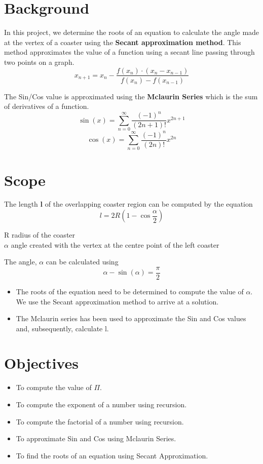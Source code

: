 \documentclass{report}
\begin{document}
\section{Background}
  In this project, we determine the roots of an equation to calculate the angle made at the vertex of a coaster using the \textbf{Secant approximation method}. This method approximates the value of a function using a secant line passing through two points on a graph.
  $$ x_{n+1} = x_n - \frac{f(x_n) \cdot (x_n - x_{n-1})}{f(x_n) - f(x_{n-1})} $$

  \vspace*{20pt}
  \noindent The Sin/Cos value is approximated using the \textbf{Mclaurin Series} which is the sum of derivatives of a function.
  $$\sin(x) = \sum_{n=0}^{\infty} \frac{(-1)^n}{(2n+1)!}x^{2n+1}$$
  $$\cos(x) = \sum_{n=0}^{\infty} \frac{(-1)^n}{(2n)!}x^{2n}$$ 

\section{Scope}
  The length \textbf{l} of the overlapping coaster region can be computed by the equation
  $$l = 2R\left(1 - \cos\frac{\alpha}{2}\right)$$

  \indent R \textrightarrow \;radius of the coaster \\
  \indent $\alpha$ \textrightarrow \;angle created with the vertex at the centre point of the left coaster

  \vspace{20pt}
  The angle, $\alpha$ can be calculated using
  $$\alpha - \sin(\alpha) = \frac{\pi}{2}$$
  
  \vspace*{20pt}
  
  \begin{itemize}
    \item {The roots of the equation need to be determined to compute the value of $\alpha$. We use the Secant approximation method to arrive at a solution.}
    \item {The Mclaurin series has been used to approximate the Sin and Cos values and, subsequently, calculate l.}
  \end{itemize}

\section{Objectives}
\begin{itemize}
  \item To compute the value of $\Pi$.
  \item To compute the exponent of a number using recursion.
  \item To compute the factorial of a number using recursion.
  \item To approximate Sin and Cos using Mclaurin Series.
  \item To find the roots of an equation using Secant Approximation.
\end{itemize}
\end{document}
